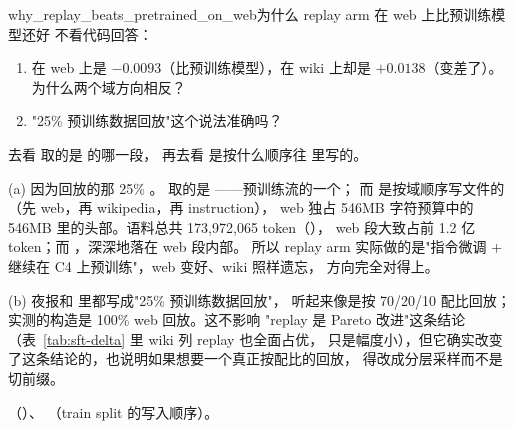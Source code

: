 \begin{checkpoint}{why_replay_beats_pretrained_on_web}{为什么 replay arm 在 web 上比预训练模型还好}
不看代码回答：
\begin{enumerate}[label=(\alph*)]
  \item {} 在 web 上是 $-0.0093$（比预训练模型），在 wiki 上却是
        $+0.0138$（变差了）。为什么两个域方向相反？
  \item "25\% 预训练数据回放"这个说法准确吗？
\end{enumerate}
\hint 去看  取的是  的哪一段，
再去看  是按什么顺序往  里写的。

\ifshowanswers
\tcblower
\answer (a) 因为回放的那 25\% 。
 取的是 ——预训练流的一个；
而  是按域顺序写文件的（先 web，再 wikipedia，再 instruction），
web 独占 546MB 字符预算中的 546MB 里的头部。语料总共 173{,}972{,}065 token（），
web 段大致占前 1.2 亿 token；而 ，深深地落在 web 段内部。
所以 replay arm 实际做的是"指令微调 + 继续在 C4 上预训练"，web 变好、wiki 照样遗忘，
方向完全对得上。

(b)  夜报和  里都写成"25\% 预训练数据回放"，
听起来像是按 70/20/10 配比回放；实测的构造是 100\% web 回放。这不影响
"replay 是 Pareto 改进"这条结论（表~\ref{tab:sft-delta} 里 wiki 列 replay 也全面占优，
只是幅度小），但它确实改变了这条结论的，也说明如果想要一个真正按配比的回放，
 得改成分层采样而不是切前缀。

\whereincode {}（）、
（train split 的写入顺序）。
\fi
\end{checkpoint}

